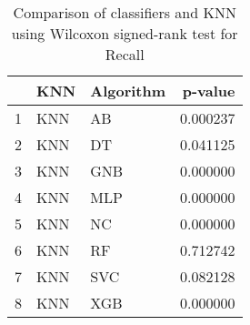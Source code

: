 \begin{table}
\footnotesize
\caption{Comparison of classifiers and KNN using Wilcoxon signed-rank test for Recall}
\label{tab:KNN wilcoxon Recall comparison}
\begin{tabular}{lllr}
\hline
 & KNN & Algorithm & p-value \\
\hline
1 & KNN & AB & 0.000237 \\
2 & KNN & DT & 0.041125 \\
3 & KNN & GNB & 0.000000 \\
4 & KNN & MLP & 0.000000 \\
5 & KNN & NC & 0.000000 \\
6 & KNN & RF & 0.712742 \\
7 & KNN & SVC & 0.082128 \\
8 & KNN & XGB & 0.000000 \\
\hline
\end{tabular}
\end{table}
